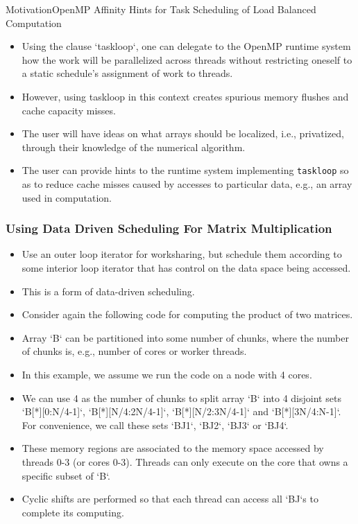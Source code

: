 \begin{frame}{Motivation}{OpenMP Affinity Hints for Task Scheduling of Load Balanced Computation}
\begin{itemize}
\small \item \small Using the clause `taskloop`, one can delegate to the OpenMP runtime system how the work will be parallelized across threads without restricting oneself to a static schedule’s assignment of work to threads. 
\item \small However, using taskloop in this context creates spurious memory flushes and cache capacity misses. 
\item \small The user will have ideas on what arrays should be localized, i.e., privatized, through their knowledge of the numerical algorithm.
\item \small The user can provide hints to the runtime system implementing \texttt{taskloop} so as to reduce cache misses caused by accesses to particular data, e.g., an array used in computation.
\end{itemize}
\end{frame}


\begin{frame}
\frametitle{Using Data Driven Scheduling For Matrix Multiplication}
\begin{itemize}
\small \item \small Use an outer loop iterator for worksharing, but schedule them according to some interior loop iterator that has control on the data space being accessed. 
\item \small This is a form of data-driven scheduling.
\end{itemize}

\begin{itemize}
\item \small Consider again the following code for computing the product of two matrices. 
\item \small Array `B` can be partitioned into some number of chunks, where the number of chunks is, e.g., number of cores or worker threads. 
\item \small In this example, we assume we run the code on a node with 4 cores. 
\item \small We can use 4 as the number of chunks to split array `B` into 4 disjoint sets `B[*][0:N/4-1]`, `B[*][N/4:2N/4-1]`, `B[*][N/2:3N/4-1]` and `B[*][3N/4:N-1]`. For convenience, we call these sets `BJ1`, `BJ2`, `BJ3` or `BJ4`. 
\item \small These memory regions are associated to the memory space accessed by threads 0-3 (or cores 0-3). Threads can only execute on the core that owns a specific subset of `B`.
\item \small Cyclic shifts are performed so that each thread can access all `BJ`s to complete its computing.
\end{itemize}
\end{frame}

